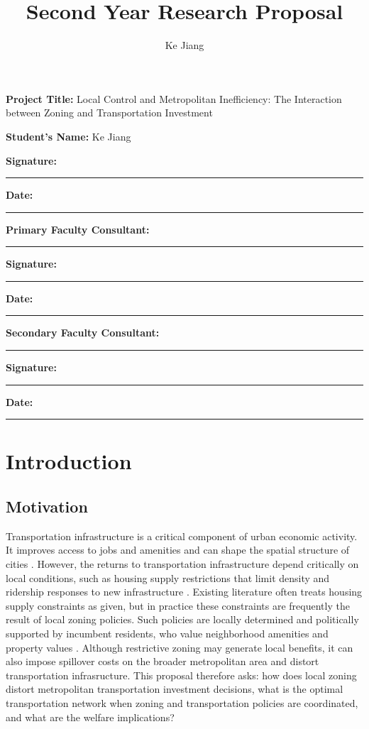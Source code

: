 \documentclass[12pt, a4paper]{article}
\title{Second Year Research Proposal}
\author{Ke Jiang}
\date{}
\begin{document}
\maketitle

\vspace{1.5cm}

\noindent\textbf{Project Title:} Local Control and
Metropolitan Inefficiency: The Interaction between
Zoning and Transportation Investment\par
\bigskip
\noindent\textbf{Student's Name:} Ke Jiang\par
\medskip
\noindent\textbf{Signature:} \rule{5cm}{0.4pt} \hfill \textbf{Date:} \rule{3.5cm}{0.4pt}\par
\bigskip\bigskip
\noindent\textbf{Primary Faculty Consultant:} \rule{10cm}{0.4pt}\par
\medskip
\noindent\textbf{Signature:} \rule{5cm}{0.4pt} \hfill \textbf{Date:} \rule{3.5cm}{0.4pt}\par
\bigskip\bigskip
\noindent\textbf{Secondary Faculty Consultant:} \rule{9.5cm}{0.4pt}\par
\medskip
\noindent\textbf{Signature:} \rule{5cm}{0.4pt} \hfill \textbf{Date:} \rule{3.5cm}{0.4pt}\par

\newpage

\section{Introduction}
\subsection{Motivation}
Transportation infrastructure is a critical component of urban economic activity. It improves access to jobs and amenities and can shape the spatial structure of cities \citep{Redding2025-fr}. However, the returns to transportation infrastructure depend critically on local conditions, such as housing supply restrictions that limit density and ridership responses to new infrastructure \citep{Tsivanidis2023-hs,Severen2021-oi}. Existing literature often treats housing supply constraints as given, but in practice these constraints are frequently the result of local zoning policies. Such policies are locally determined and politically supported by incumbent residents, who value neighborhood amenities and property values \citep{Rollet2025-mk}. Although restrictive zoning may generate local benefits, it can also impose spillover costs on the broader metropolitan area and distort transportation infrasructure. This proposal therefore asks: how does local zoning distort metropolitan transportation investment decisions, what is the optimal transportation network when zoning and transportation policies are coordinated, and what are the welfare implications?
\end{document}
